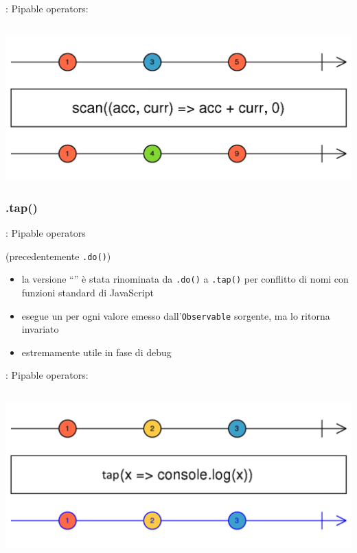             \begin{frame}[fragile]{\insertsubsectionhead}{: Pipable operators: \texttt{\insertsubsubsectionhead}}
                \inputminted{js}{src/scan.js}
                \includegraphics[width=\linewidth]{scan}
            \end{frame}

            \subsubsection{.tap()}\label{subsub:tap}

            \begin{frame}{\insertsubsectionhead}{: Pipable operators}
                \begin{block}{\texttt{\insertsubsubsectionhead} (precedentemente \texttt{.do()})}
                    \begin{itemize}
                        \item
                            la versione ``'' è stata rinominata da \texttt{.do()} a \texttt{.tap()} per conflitto di nomi con funzioni standard di JavaScript
                        \item
                            esegue un  per ogni valore emesso dall'\texttt{Observable} sorgente, ma lo ritorna invariato
                        \item
                            estremamente utile in fase di debug
                    \end{itemize}
                \end{block}
            \end{frame}

            \begin{frame}[fragile]{\insertsubsectionhead}{: Pipable operators: \texttt{\insertsubsubsectionhead}}
                \inputminted{js}{src/tap.js}
                \includegraphics[width=\linewidth]{tap}
            \end{frame}

